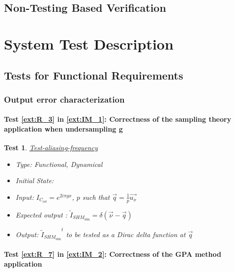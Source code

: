 \documentclass[12pt, titlepage]{article}
\newtheorem{Test}{Test}
\begin{document}

\subsection{Non-Testing Based Verification}


\section{System Test Description}
	
\subsection{Tests for Functional Requirements}
\renewcommand{\labelitemi}{$\star$}

\subsubsection{Output error characterization}
	
\paragraph{Test \cref{ext:R_3} in \cref{ext:IM_1}: Correctness of the sampling theory application when undersampling g}

\begin{Test}\normalfont\underline{Test-aliasing-frequency}
\begin{itemize}
\item Type: Functional, Dynamical
\item Initial State: 
\item Input: $I_{C_{\text{ref}}}=e^{2i\pi gx}$, $p$ such that $\overrightarrow{q}=\frac{1}{p}\vec{u_x}$
\item Expected output : $\widetilde{I}_{\mathit{SHM}_{\text{sim}}}=\delta(\vec{\nu}-\vec{q})$
\item Output: ${\widetilde{I}_{\mathit{SHM}_{\text{sim}}}}^{t}$ to be tested as a Dirac delta function at $\overrightarrow{q}$
\end{itemize}
\end{Test}
		
\paragraph{Test \cref{ext:R_7} in \cref{ext:IM_2}: Correctness of the GPA method application} 
\end{document}
